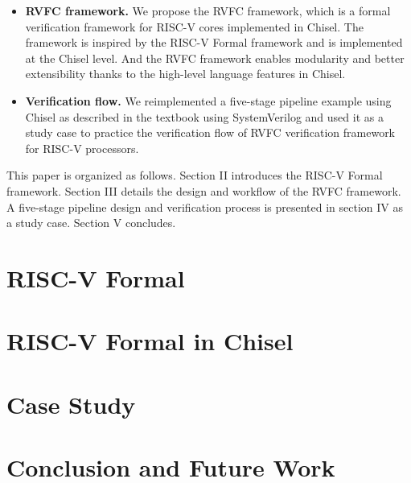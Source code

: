 \documentclass[conference]{IEEEtran}
\theoremstyle{definition}
\begin{document}
\begin{itemize}
    \item \textbf{RVFC framework.} 
    We propose the RVFC framework, which is a formal verification framework for RISC-V cores implemented in Chisel. The framework is inspired by the RISC-V Formal framework and is implemented at the Chisel level.
    And the RVFC framework enables modularity and better extensibility thanks to the high-level language features in Chisel.
    \item \textbf{Verification flow.}
    We reimplemented a five-stage pipeline example using Chisel as described in the textbook \cite{patterson2017computer} using SystemVerilog and used it as a study case to practice the verification flow of RVFC verification framework for RISC-V processors.
\end{itemize}

This paper is organized as follows. Section II introduces the RISC-V Formal framework. Section III details the design and workflow of the RVFC framework. 
A five-stage pipeline design and verification process is presented in section IV as a study case.
Section V concludes.

\section{RISC-V Formal}

\section{RISC-V Formal in Chisel}

\section{Case Study}

\section{Conclusion and Future Work}



\end{document}
